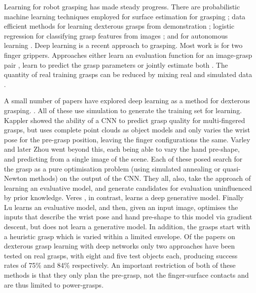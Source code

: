 Learning for robot grasping has made steady progress. There are probabilistic machine learning techniques employed for surface estimation for grasping \cite{dragiev2011gaussian}; data efficient methods for learning dexterous grasps from demonstration \cite{ben-amor2012a,kopicki2015ijrr,detry2012a}; logistic regression for classifying grasp features from images \cite{saxena2008a}; and for autonomous learning \cite{detry2010a}. Deep learning is a recent approach to grasping. Most work is for two finger grippers. Approaches either learn an evaluation function for an image-grasp pair \cite{levine16,lenz2015deep,gualtieri2016high,mahler2017dex,pinto2016supersizing,johns2016deep}, learn to predict the grasp parameters \cite{redmon2015real,kumra2017iros} or jointly estimate both \cite{morrison18}. The quantity of real training grasps can be reduced by mixing real and simulated data \cite{bousmalis2017using}. 

A small number of papers have explored deep learning as a method for dexterous grasping. \cite{lu2017planning,varley2015generating,veres2017modeling,zhou20176dof,kappler2015leveraging}. All of these use simulation to generate the training set for learning. Kappler \cite{kappler2015leveraging} showed the ability of a CNN to predict grasp quality for multi-fingered grasps, but uses complete point clouds as object models and only varies the wrist pose for the pre-grasp position, leaving the finger configurations the same. Varley \cite{varley2015generating} and later Zhou \cite{zhou20176dof} went beyond this, each being able to vary the hand pre-shape, and predicting from a single image of the scene. Each of these posed search for the grasp as a pure optimisation problem (using simulated annealing or quasi-Newton methods) on the output of the CNN. They all, also, take the approach of learning an evaluative model, and generate candidates for evaluation uninfluenced by prior knowledge. Veres \cite{veres2017modeling}, in contrast, learns a deep generative model. Finally Lu \cite{lu2017planning} learns an evaluative model, and then, given an input image, optimises the inputs that describe the wrist pose and hand pre-shape to this model via gradient descent, but does not learn a generative model. In addition, the grasps start with a heuristic grasp which is varied within a limited envelope. Of the papers on dexterous grasp learning with deep networks only two approaches \cite{varley2015generating,lu2017planning} have been tested on real grasps, with eight and five test objects each, producing success rates of 75\% and 84\% respectively. An important restriction of both of these methods is that they only plan the pre-grasp, not the finger-surface contacts and are thus limited to power-grasps.

